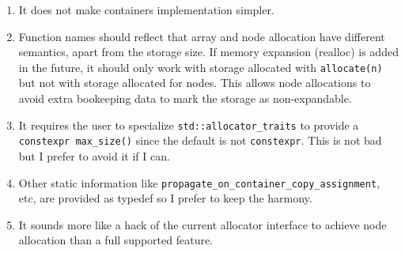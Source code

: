 \documentclass[11pt]{article}
\begin{document}
\begin{enumerate}
\item It does not make containers implementation simpler.

\item Function names should reflect that array and node allocation have
different semantics, apart from the storage size. If memory expansion (realloc)
is added in the future, it should only work with storage allocated with
\texttt{allocate(n)} but not with storage allocated for nodes. This allows node
allocations to avoid extra bookeeping data to mark the storage as
non-expandable.

\item It requires the user to specialize \texttt{std::allocator\_traits} to
provide a \texttt{constexpr max\_size()} since the default is not
\texttt{constexpr}. This is not bad but I prefer to avoid it if I can.

\item Other static information like \texttt{propagate\_on\_container\_copy\_assignment}, etc,
are provided as typedef so I prefer to keep the harmony.

\item It sounds more like a hack of the current allocator interface to achieve
node allocation than a full supported feature.

\end{enumerate}
\end{document}
